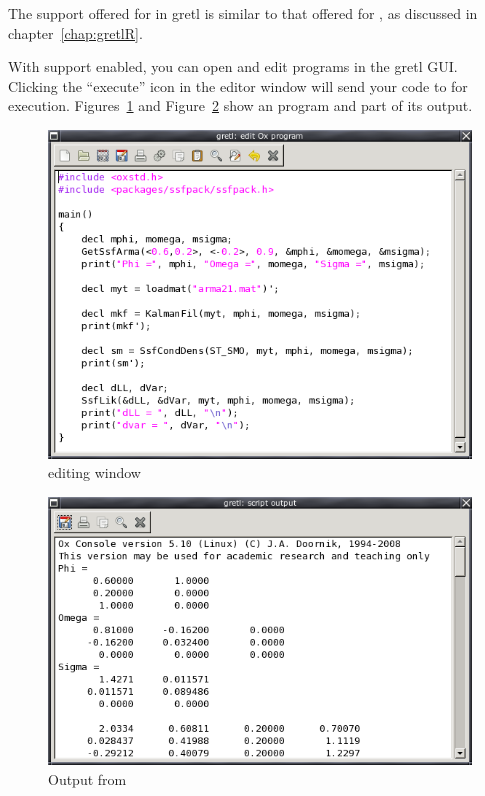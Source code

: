 The support offered for  in gretl is similar to that
offered for , as discussed in chapter~\ref{chap:gretlR}.

  
With support enabled, you can open and edit  programs in the
gretl GUI.  Clicking the ``execute'' icon in the editor window
will send your code to  for execution.
Figures~\ref{fig:Oxedit} and Figure~\ref{fig:Oxout} show an 
program and part of its output.

\begin{figure}[htbp]
  \centering
  \includegraphics[scale=0.7]{figures/Oxedit}
  \caption{ editing window}
  \label{fig:Oxedit}
\end{figure}

\begin{figure}[htbp]
  \centering
  \includegraphics[scale=0.7]{figures/Oxout}
  \caption{Output from }
  \label{fig:Oxout}
\end{figure}

